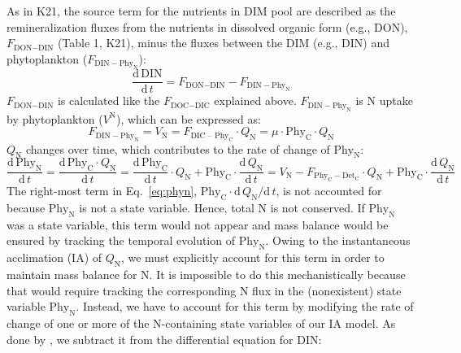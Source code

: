 \documentclass[gmd, manuscript, draft]{copernicus}
\begin{document}
As in K21, the source term for the nutrients in DIM pool are described as the remineralization fluxes from the nutrients in dissolved organic form (e.g., DON), $F_{\text{DON}-\text{DIN}}$ (Table 1, K21), minus the fluxes between the DIM (e.g., DIN) and phytoplankton ($F_{\text{DIN}-\text{Phy}_{\text{N}}}$): 
\begin{equation} \label{eq:sdin}
  \frac{\text{d}\,\text{DIN}}{\text{d}\,t} = F_{\text{DON}-\text{DIN}} - F_{\text{DIN}-\text{Phy}_{\text{N}}}
\end{equation}
$F_{\text{DON}-\text{DIN}}$ is calculated like the $F_{\text{DOC}-\text{DIC}}$ explained above. $F_{\text{DIN}-\text{Phy}_{\text{N}}}$ is N uptake by phytoplankton ($V^{\text{N}}$), which can be expressed as:
\begin{equation} \label{eq:dphyNdt}
  F_{\text{DIN}-\text{Phy}_{\text{N}}} = V_{\text{N}} = F_{\text{DIC -- Phy}_{\text{C}}} \cdot Q_{\text{N}} = \mu \cdot \text{Phy}_{\text{C}} \cdot Q_{\text{N}}
\end{equation}
$Q_{\text{N}}$ changes over time, which contributes to the rate of change of $\text{Phy}_{\text{N}}$:
\begin{equation}
  \label{eq:phyn}
  \frac{\mathrm{d}\,\text{Phy}_{\text{N}}}{\mathrm{d}\,t} = \frac{\mathrm{d}\,\text{Phy}_{\text{C}}\cdot Q_{\text{N}}}{\mathrm{d}\,t}
  = \frac{\mathrm{d}\,\text{Phy}_{\text{C}}}{\mathrm{d}\,t} \cdot Q_{\text{N}} + \text{Phy}_{\text{C}} \cdot \frac{\mathrm{d}\,Q_{\text{N}}}{\mathrm{d}\,t}
  = V_{\text{N}} - F_{\text{Phy}_{\text{C}}-\text{Det}_{\text{C}}}\cdot Q_{\text{N}} + \text{Phy}_{\text{C}} \cdot \frac{\mathrm{d}\,Q_{\text{N}}}{\mathrm{d}\,t}
\end{equation}
The right-most term in Eq.~\eqref{eq:phyn}, $\text{Phy}_{\text{C}}\cdot \mathrm{d}\,Q_{\text{N}} / \mathrm{d}\, t$, is not accounted for because $\text{Phy}_{\text{N}}$ is not a state variable.  Hence, total N is not conserved.  If $\text{Phy}_{\text{N}}$ was a state variable, this term would not appear and mass balance would be ensured by tracking the temporal evolution of $\text{Phy}_{\text{N}}$.  Owing to the instantaneous acclimation (IA) of $Q_{\text{N}}$, we must explicitly account for this term in order to maintain mass balance for N\@.  It is impossible to do this mechanistically because that would require tracking the corresponding N flux in the (nonexistent) state variable $\text{Phy}_{\text{N}}$.  Instead, we have to account for this term by modifying the rate of change of one or more of the N-containing state variables of our IA model.  As done by \citet{Smith2016}, we subtract it from the differential equation for DIN\@:
\end{document}
